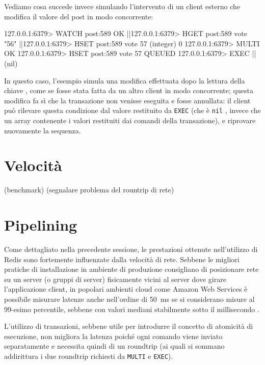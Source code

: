 Vediamo cosa succede invece simulando l'intervento di un client esterno che modifica il valore
del post in modo concorrente:

\begin{commentedsource}[style=redis]
127.0.0.1:6379> WATCH post:589
OK
|\lnote|127.0.0.1:6379> HGET post:589 vote
"56"
|\lnote|127.0.0.1:6379> HSET post:589 vote 57
(integer) 0
127.0.0.1:6379> MULTI
OK
127.0.0.1:6379> HSET post:589 vote 57
QUEUED
127.0.0.1:6379> EXEC
|\lnote|(nil)
\end{commentedsource}

In questo caso, l'esempio simula una modifica  effettuata dopo la lettura della chiave
, come se fosse stata fatta da un altro client in modo concorrente; questa modifica fa sì
che la transazione non venisse eseguita e fosse annullata: il client può rilevare questa condizione
dal valore restituito da \verb|EXEC| (che è \verb|nil| , invece che un array contenente i
valori restituiti dai comandi della transazione), e riprovare nuovamente la sequenza.

\section{Velocità}

(benchmark)
(segnalare problema del rountrip di rete)


\section{Pipelining}

Come dettagliato nella precedente sessione, le prestazioni ottenute nell'utilizzo di Redis sono
fortemente influenzate dalla velocità di rete. Sebbene le migliori pratiche di installazione in
ambiente di produzione consigliano di posizionare rete su un server (o gruppi di server) fisicamente
vicini al server dove girare l'applicazione client, in popolari ambienti cloud come Amazon Web
Services è possibile misurare latenze anche nell'ordine di \SI{50}{\milli\second} se si considerano
misure al 99-esimo percentile, sebbene con valori mediani stabilmente sotto il millisecondo
\cite{aws-latency}.

L'utilizzo di transazioni, sebbene utile per introdurre il concetto di atomicità di esecuzione,
non migliora la latenza poiché ogni comando viene inviato separatamente e necessita quindi di un 
roundtrip (ai quali si sommano addirittura i due roundtrip richiesti da \verb|MULTI| e \verb|EXEC|).

